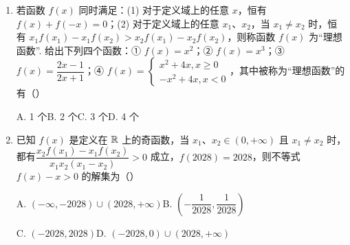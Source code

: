 \documentclass[a4paper,11pt]{article}
\begin{document}
\begin{enumerate}
\item 若函数 $f(x)$ 同时满足：(1) 对于定义域上的任意 $x$，恒有 $f(x)+f(-x)=0$；(2) 对于定义域上的任意 $x_1$、$x_2$，当 $x_1\neq x_2$ 时，恒有 $x_1f(x_1)-x_1f(x_2)>x_2f(x_1)-x_2f(x_2)$，则称函数 $f(x)$ 为“理想函数”. 给出下列四个函数：① $f(x)=x^2$；② $f(x)=x^3$；③ $f(x)=\dfrac{2x-1}{2x+1}$；④ $f(x)=\begin{cases}x^2+4x,x\geqslant0\\-x^2+4x,x<0\end{cases}$，其中被称为“理想函数”的有\mbox{（\quad）}

\keepwithprev
A. 1 个\qquad\qquad B. 2 个\qquad\qquad C. 3 个\qquad\qquad D. 4 个

\ifanswer
\solbegin
{}
\solend
\fi

\item 已知 $f(x)$ 是定义在 $\mathbb{R}$ 上的奇函数，当 $x_1$、$x_2\in(0,+\infty)$ 且 $x_1\neq x_2$ 时，都有\newline $\dfrac{x_2f(x_1)-x_1f(x_2)}{x_1x_2(x_1-x_2)}>0$ 成立，$f(2028)=2028$，则不等式 $f(x)-x>0$ 的解集为\mbox{（\quad）}

\keepwithprev
A. $(-\infty,-2028)\cup(2028,+\infty)$\qquad\qquad B. $\left(-\dfrac1{2028},\dfrac1{2028}\right)$

C. $(-2028,2028)$\qquad\qquad D. $(-2028,0)\cup(2028,+\infty)$


\end{enumerate}
\end{document}
